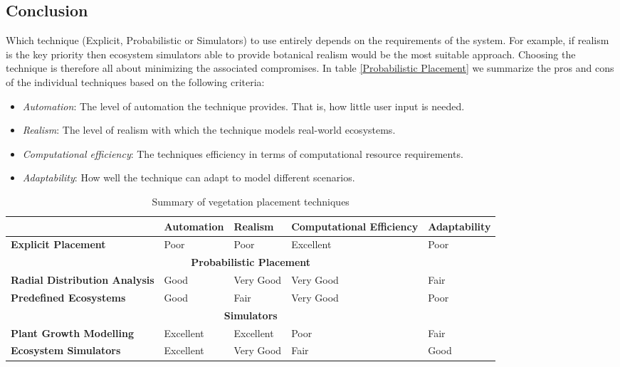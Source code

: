 \subsection{Conclusion} \label{Conclusion}

Which technique (Explicit, Probabilistic or Simulators) to use entirely depends on the requirements of the system. For example, if realism is the key priority then ecosystem simulators able to provide botanical realism would be the most suitable approach. Choosing the technique is therefore all about minimizing the associated compromises. In table \ref{Probabilistic Placement} we summarize the pros and cons of the individual techniques based on the following criteria: 
\begin{itemize}
\item \textit{Automation}: The level of automation the technique provides. That is, how little user input is needed.
\item \textit{Realism}: The level of realism with which the technique models real-world ecosystems.
\item \textit{Computational efficiency}: The techniques efficiency in terms of computational resource requirements.
\item \textit{Adaptability}: How well the technique can adapt to model different scenarios.
\end{itemize}
\begin{table}[h]
  \centering
	    \begin{tabular}{|p{4cm}|p{3cm}|p{3cm}|p{3cm}|p{3cm}|}
  	    \hline	
  	      & \textbf{Automation} & \textbf{Realism} & \textbf{Computational Efficiency} & \textbf{Adaptability} \\
		\hline	
		\textbf{Explicit Placement} & 
		 Poor  & Poor  & Excellent & Poor      \\
  	    \hline	
  	    \multicolumn{5}{|c|}{\textbf{Probabilistic Placement}} \\
  	    \hline				
  	    \textbf{Radial Distribution Analysis} & 
		 Good & Very Good & Very Good & Fair   \\
  	    \hline
		\textbf{Predefined Ecosystems} & 
		 Good & Fair & Very Good & Poor      \\
  	    \hline
		\multicolumn{5}{|c|}{\textbf{Simulators}} \\
  	    \hline		
		\textbf{Plant Growth Modelling} & 
		 Excellent & Excellent & Poor & Fair  \\
  	    \hline
		\textbf{Ecosystem Simulators} & 
		 Excellent & Very Good & Fair & Good   \\
  	    \hline
  	    \end{tabular}
  \caption[Summary of vegetation placement techniques]{Summary of vegetation placement techniques}
  \label{Pros and cons of individual techniques}
\end{table}

